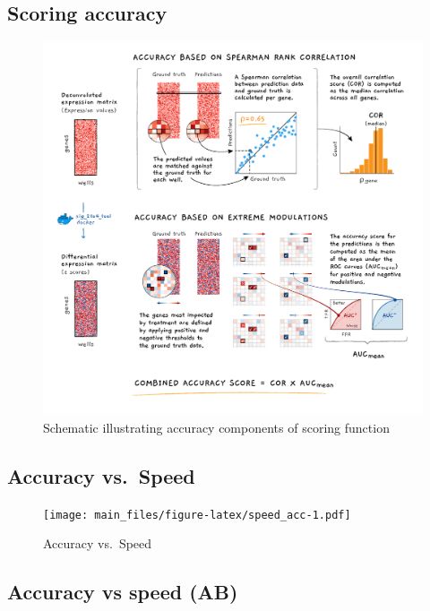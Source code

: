 \documentclass[]{article}
\begin{document}
\hypertarget{scoring-accuracy}{%
\subsection{Scoring accuracy}\label{scoring-accuracy}}

\begin{figure}
\centering
\includegraphics{figures/deconvolution_contest Fig2_Final_revised.png}
\caption{Schematic illustrating accuracy components of scoring function}
\end{figure}

\hypertarget{accuracy-vs.-speed}{%
\subsection{Accuracy vs.~Speed}\label{accuracy-vs.-speed}}

\begin{figure}
\centering
\texttt{[image: main\_files/figure-latex/speed\_acc-1.pdf]}
\caption{\label{speed_acc}Accuracy vs.~Speed}
\end{figure}

\hypertarget{accuracy-vs-speed-ab}{%
\subsection{Accuracy vs speed (AB)}\label{accuracy-vs-speed-ab}}
\end{document}
